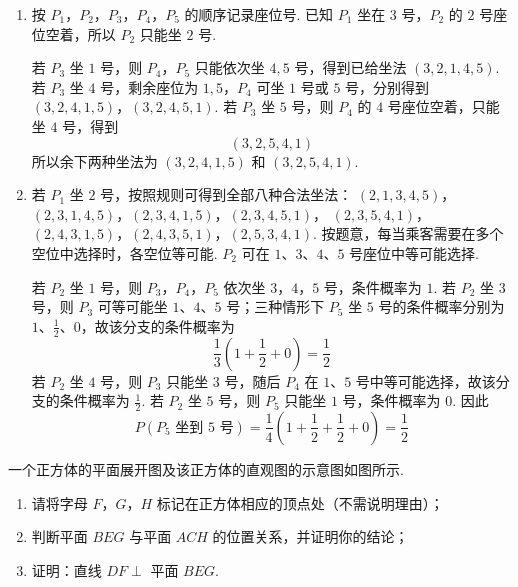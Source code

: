 \begin{solution}
\begin{enumerate}
\item 按 \(P_1\)，\(P_2\)，\(P_3\)，\(P_4\)，\(P_5\) 的顺序记录座位号. 已知 \(P_1\) 坐在 \(3\) 号，\(P_2\) 的 \(2\) 号座位空着，所以 \(P_2\) 只能坐 \(2\) 号.

若 \(P_3\) 坐 \(1\) 号，则 \(P_4\)，\(P_5\) 只能依次坐 \(4,5\) 号，得到已给坐法 \((3,2,1,4,5)\). 若 \(P_3\) 坐 \(4\) 号，剩余座位为 \(1,5\)，\(P_4\) 可坐 \(1\) 号或 \(5\) 号，分别得到
\((3,2,4,1,5)\)，\((3,2,4,5,1)\).
若 \(P_3\) 坐 \(5\) 号，则 \(P_4\) 的 \(4\) 号座位空着，只能坐 \(4\) 号，得到
\[
(3,2,5,4,1)
\]
所以余下两种坐法为 \((3,2,4,1,5)\) 和 \((3,2,5,4,1)\).

\item 若 \(P_1\) 坐 \(2\) 号，按照规则可得到全部八种合法坐法：
\((2,1,3,4,5)\)，\((2,3,1,4,5)\)，\((2,3,4,1,5)\)，\((2,3,4,5,1)\)，
\((2,3,5,4,1)\)，\((2,4,3,1,5)\)，\((2,4,3,5,1)\)，\((2,5,3,4,1)\).
按题意，每当乘客需要在多个空位中选择时，各空位等可能. \(P_2\) 可在 \(1\)、\(3\)、\(4\)、\(5\) 号座位中等可能选择.

若 \(P_2\) 坐 \(1\) 号，则 \(P_3\)，\(P_4\)，\(P_5\) 依次坐 \(3\)，\(4\)，\(5\) 号，条件概率为 \(1\). 若 \(P_2\) 坐 \(3\) 号，则 \(P_3\) 可等可能坐 \(1\)、\(4\)、\(5\) 号；三种情形下 \(P_5\) 坐 \(5\) 号的条件概率分别为 \(1\)、\(\frac12\)、\(0\)，故该分支的条件概率为
\[
\frac13\left(1+\frac12+0\right)=\frac12
\]
若 \(P_2\) 坐 \(4\) 号，则 \(P_3\) 只能坐 \(3\) 号，随后 \(P_4\) 在 \(1\)、\(5\) 号中等可能选择，故该分支的条件概率为 \(\frac12\). 若 \(P_2\) 坐 \(5\) 号，则 \(P_5\) 只能坐 \(1\) 号，条件概率为 \(0\). 因此
\[
P(P_5\text{ 坐到 }5\text{ 号})=\frac14\left(1+\frac12+\frac12+0\right)=\frac12
\]
\end{enumerate}
\end{solution}

\begin{problem}
一个正方体的平面展开图及该正方体的直观图的示意图如图所示.

\begin{enumerate}
\item 请将字母 \(F\)，\(G\)，\(H\) 标记在正方体相应的顶点处（不需说明理由）；
\item 判断平面 \(BEG\) 与平面 \(ACH\) 的位置关系，并证明你的结论；
\item 证明：直线 \(DF \perp\) 平面 \(BEG\).
\end{enumerate}

\end{problem}

